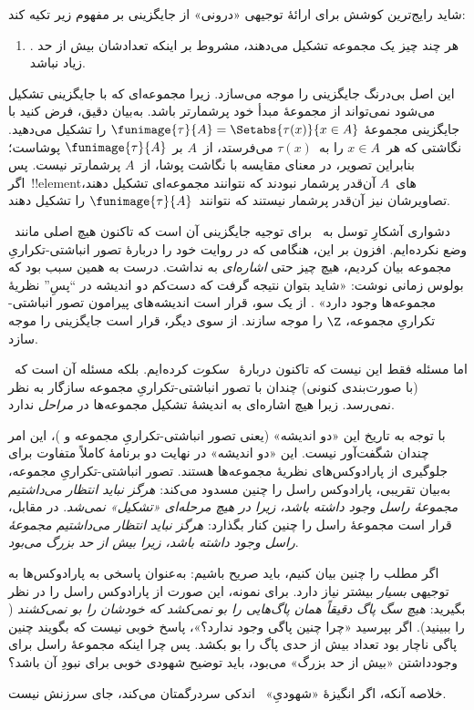\documentclass[../../../include/open-logic-section]{subfiles}
\begin{document}

شاید رایج‌ترین کوشش برای ارائهٔ توجیهی «درونی» از جایگزینی بر مفهوم زیر
تکیه کند:
\begin{enumerate}
	\item[] \limofsize. هر چند چیز یک مجموعه تشکیل می‌دهند، مشروط بر
	اینکه تعدادشان بیش از حد زیاد نباشد.
\end{enumerate}
این اصل بی‌درنگ جایگزینی را موجه می‌سازد. زیرا مجموعه‌ای که با جایگزینی
تشکیل می‌شود نمی‌تواند از مجموعهٔ مبدأ خود پرشمارتر باشد. به‌بیان دقیق،
فرض کنید با جایگزینی مجموعهٔ
$\funimage{\tau}{A}=\Setabs{\tau(x)}{x\in A}$ را تشکیل می‌دهید. نگاشتی
که هر~$x\in A$ را به~$\tau(x)$ می‌فرستد، از~$A$ بر
$\funimage{\tau}{A}$ پوشاست؛ بنابراین تصویر، در معنای مقایسه با نگاشت
پوشا، از~$A$ پرشمارتر نیست. پس اگر~!!{element}های~$A$ آن‌قدر پرشمار
نبودند که نتوانند مجموعه‌ای تشکیل دهند، تصاویرشان نیز آن‌قدر پرشمار
نیستند که نتوانند~$\funimage{\tau}{A}$ را تشکیل دهند.

دشواری آشکارِ توسل به~\limofsize{} برای توجیه جایگزینی آن است که تاکنون
هیچ اصلی مانند~\limofsize{} وضع نکرده‌ایم. افزون بر این، هنگامی که در
 روایت خود را دربارهٔ تصور
انباشتی-تکراریِ مجموعه بیان کردیم، هیچ چیز حتی \emph{اشاره‌ای} به
\limofsize{} نداشت. درست به همین سبب بود که بولوس زمانی نوشت: «شاید بتوان
نتیجه گرفت که دست‌کم دو اندیشه در ``پسِ'' نظریهٔ مجموعه‌ها وجود دارد»
\citeyearpar[p.~19]{Boolos1989}. از یک سو، قرار است اندیشه‌های پیرامون
تصور انباشتی-تکراریِ مجموعه، $\Z$ را موجه سازند. از سوی دیگر، قرار است
\limofsize{} جایگزینی را موجه سازد.

اما مسئله فقط این نیست که تاکنون دربارهٔ~\limofsize{} \emph{سکوت}
کرده‌ایم. بلکه مسئله آن است که~\limofsize{} (با صورت‌بندی کنونی) چندان
با تصور انباشتی-تکراریِ مجموعه سازگار به نظر نمی‌رسد. زیرا هیچ اشاره‌ای
به اندیشهٔ تشکیل مجموعه‌ها در \emph{مراحل} ندارد.

با توجه به تاریخ این «دو اندیشه» (یعنی تصور انباشتی-تکراریِ مجموعه و
\limofsize)، این امر چندان شگفت‌آور نیست. این «دو اندیشه» در نهایت دو
برنامهٔ کاملاً متفاوت برای جلوگیری از پارادوکس‌های نظریهٔ مجموعه‌ها
هستند. تصور انباشتی-تکراریِ مجموعه، به‌بیان تقریبی، پارادوکس راسل را
چنین مسدود می‌کند: \emph{هرگز نباید انتظار می‌داشتیم مجموعهٔ راسل وجود
داشته باشد، زیرا در هیچ مرحله‌ای «تشکیل» نمی‌شد}. در مقابل، قرار است
\limofsize{} مجموعهٔ راسل را چنین کنار بگذارد: \emph{هرگز نباید انتظار
می‌داشتیم مجموعهٔ راسل وجود داشته باشد، زیرا بیش از حد بزرگ می‌بود}.

اگر مطلب را چنین بیان کنیم، باید صریح باشیم: \limofsize{} به‌عنوان پاسخی
به پارادوکس‌ها به توجیهی \emph{بسیار} بیشتر نیاز دارد. برای نمونه، این
صورت از پارادوکس راسل را در نظر بگیرید: \emph{هیچ سگ پاگ دقیقاً همان
پاگ‌هایی را بو نمی‌کشد که خودشان را بو نمی‌کشند}
( را ببینید). اگر بپرسید «چرا چنین پاگی وجود
ندارد؟»، پاسخ خوبی نیست که بگویند چنین پاگی ناچار بود تعداد بیش از حدی
پاگ را بو بکشد. پس چرا اینکه مجموعهٔ راسل برای وجودداشتن «بیش از حد
بزرگ» می‌بود، باید توضیح شهودی خوبی برای نبودِ آن باشد؟

خلاصه آنکه، اگر انگیزهٔ «شهودیِ»~\limofsize{} اندکی سردرگمتان می‌کند،
جای سرزنش نیست.
\end{document}
